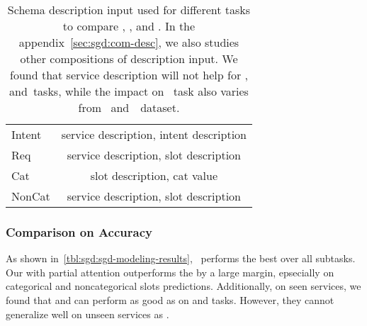 \begin{table}[!t]
\caption{\label{tbl:sgd:schema-seq} Schema description input used for
  different tasks to compare \DE, \CE, and \FE. In the
  appendix~\ref{sec:sgd:com-desc}, we also studies other compositions of
description input. We found that service description will not help for
\IC, \RSI and~\CSL tasks, while the impact on \NSL~task also varies
from \sgdst~and~\multiwoz~dataset.}
\begin{center}{\small
\setlength{\tabcolsep}{3pt}
\begin{tabular}{l|c}
  \toprule
\hline
Intent & service description, intent description \\
Req    & service description, slot description   \\
Cat    & slot description, cat value             \\
NonCat & service description, slot description   \\
\hline
  \bottomrule
\end{tabular}}
\end{center}
\end{table}


\subsubsection{Comparison on Accuracy}
\label{sssec:sgd:enc-results}
As shown in~\autoref{tbl:sgd:sgd-modeling-results},
\CE~performs the best over all subtasks. Our \FE with partial
attention outperforms the \DE by a large margin, epsecially on
categorical and noncategorical slots predictions. Additionally, on
seen services, we found that \DE and \FE can perform as good as \CE on
\IC and \RSI tasks. However, they cannot generalize well on unseen
services as \CE. %

